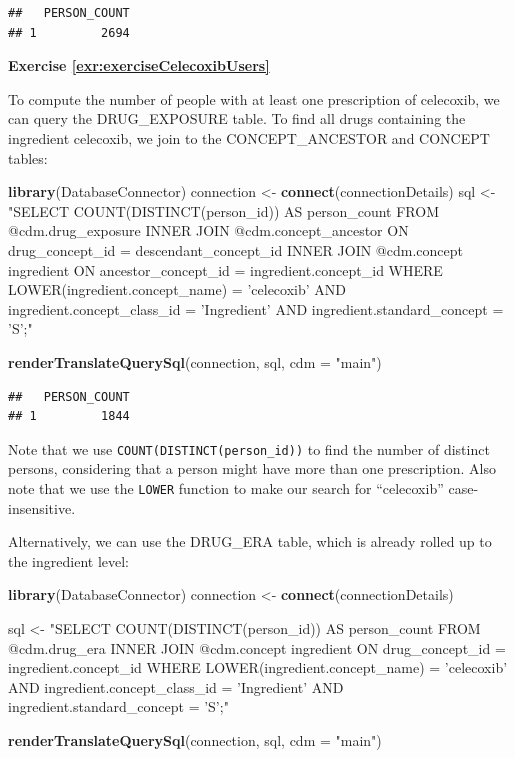 \documentclass[11pt]{book}
\newenvironment{Shaded}{\begin{snugshade}}{\end{snugshade}}
\newcommand{\DataTypeTok}[1]{\textcolor[rgb]{0.13,0.29,0.53}{#1}}
\newcommand{\KeywordTok}[1]{\textcolor[rgb]{0.13,0.29,0.53}{\textbf{#1}}}
\newcommand{\NormalTok}[1]{#1}
\newcommand{\StringTok}[1]{\textcolor[rgb]{0.31,0.60,0.02}{#1}}
\theoremstyle{definition}
\theoremstyle{definition}
\theoremstyle{definition}
\theoremstyle{remark}
\begin{document}
\begin{verbatim}
##   PERSON_COUNT
## 1         2694
\end{verbatim}

\textbf{Exercise \ref{exr:exerciseCelecoxibUsers}}

To compute the number of people with at least one prescription of celecoxib, we can query the DRUG\_EXPOSURE table. To find all drugs containing the ingredient celecoxib, we join to the CONCEPT\_ANCESTOR and CONCEPT tables:

\begin{Shaded}
\begin{Highlighting}[]
\KeywordTok{library}\NormalTok{(DatabaseConnector)}
\NormalTok{connection <-}\StringTok{ }\KeywordTok{connect}\NormalTok{(connectionDetails)}
\NormalTok{sql <-}\StringTok{ "SELECT COUNT(DISTINCT(person_id)) AS person_count}
\StringTok{FROM @cdm.drug_exposure}
\StringTok{INNER JOIN @cdm.concept_ancestor}
\StringTok{  ON drug_concept_id = descendant_concept_id}
\StringTok{INNER JOIN @cdm.concept ingredient}
\StringTok{  ON ancestor_concept_id = ingredient.concept_id}
\StringTok{WHERE LOWER(ingredient.concept_name) = 'celecoxib'}
\StringTok{  AND ingredient.concept_class_id = 'Ingredient'}
\StringTok{  AND ingredient.standard_concept = 'S';"}

\KeywordTok{renderTranslateQuerySql}\NormalTok{(connection, sql, }\DataTypeTok{cdm =} \StringTok{"main"}\NormalTok{)}
\end{Highlighting}
\end{Shaded}

\begin{verbatim}
##   PERSON_COUNT
## 1         1844
\end{verbatim}

Note that we use \texttt{COUNT(DISTINCT(person\_id))} to find the number of distinct persons, considering that a person might have more than one prescription. Also note that we use the \texttt{LOWER} function to make our search for ``celecoxib'' case-insensitive.

Alternatively, we can use the DRUG\_ERA table, which is already rolled up to the ingredient level:

\begin{Shaded}
\begin{Highlighting}[]
\KeywordTok{library}\NormalTok{(DatabaseConnector)}
\NormalTok{connection <-}\StringTok{ }\KeywordTok{connect}\NormalTok{(connectionDetails)}

\NormalTok{sql <-}\StringTok{ "SELECT COUNT(DISTINCT(person_id)) AS person_count}
\StringTok{FROM @cdm.drug_era}
\StringTok{INNER JOIN @cdm.concept ingredient}
\StringTok{  ON drug_concept_id = ingredient.concept_id}
\StringTok{WHERE LOWER(ingredient.concept_name) = 'celecoxib'}
\StringTok{  AND ingredient.concept_class_id = 'Ingredient'}
\StringTok{  AND ingredient.standard_concept = 'S';"}

\KeywordTok{renderTranslateQuerySql}\NormalTok{(connection, sql, }\DataTypeTok{cdm =} \StringTok{"main"}\NormalTok{)}
\end{Highlighting}
\end{Shaded}
\end{document}
